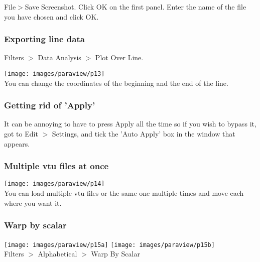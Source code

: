 File$>$Save Screenshot. Click OK on the first panel. Enter the name of the file you have chosen and click OK.   

\subsubsection*{Exporting line data}

Filters $>$ Data Analysis $>$ Plot Over Line.  

\begin{center}
\texttt{[image: images/paraview/p13]}\\
{\captionfont You can change the coordinates of the beginning and the end of the line.} 
\end{center}

\subsubsection*{Getting rid of 'Apply'}

It can be annoying to have to press Apply all the time so if you wish to bypass it, got to Edit $>$ Settings, and 
tick the 'Auto Apply' box in the window that appears.

\subsubsection*{Multiple vtu files at once}

\begin{center}
\texttt{[image: images/paraview/p14]}\\
{\captionfont You can load multiple vtu files or the same one multiple times and move each where you want it.} 
\end{center}

\subsubsection*{Warp by scalar}

\begin{center}
\texttt{[image: images/paraview/p15a]}
\texttt{[image: images/paraview/p15b]}\\
{\captionfont Filters $>$ Alphabetical $>$ Warp By Scalar} 
\end{center}






